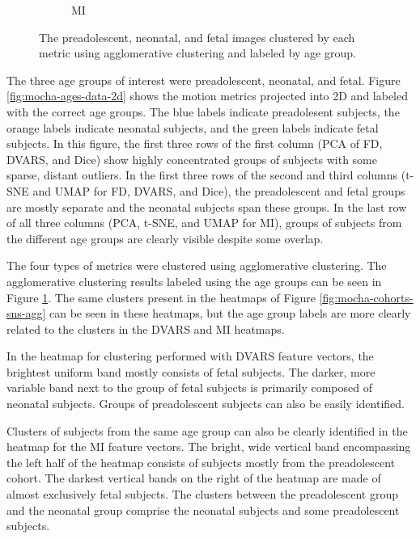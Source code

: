 \begin{figure}[]
\begin{subfigure}{0.49\textwidth}
		\caption{MI}
	\end{subfigure}
\vspace{-10mm}
\caption{The preadolescent, neonatal, and fetal images clustered by each metric using agglomerative clustering and labeled by age group.}
\label{fig:mocha-ages-sns-agg}
\end{figure}

The three age groups of interest were preadolescent, neonatal, and fetal. Figure \ref{fig:mocha-ages-data-2d} shows the motion metrics projected into 2D and labeled with the correct age groups. The blue labels indicate preadolesent subjects, the orange labels indicate neonatal subjects, and the green labels indicate fetal subjects. In this figure, the first three rows of the first column (PCA of FD, DVARS, and Dice) show highly concentrated groups of subjects with some sparse, distant outliers. In the first three rows of the second and third columns (t-SNE and UMAP for FD, DVARS, and Dice), the preadolescent and fetal groups are mostly separate and the neonatal subjects span these groups. In the last row of all three columns (PCA, t-SNE, and UMAP for MI), groups of subjects from the different age groups are clearly visible despite some overlap. 

The four types of metrics were clustered using agglomerative clustering. The agglomerative clustering results labeled using the age groups can be seen in Figure \ref{fig:mocha-ages-sns-agg}. The same clusters present in the heatmaps of Figure \ref{fig:mocha-cohorts-sns-agg} can be seen in these heatmaps, but the age group labels are more clearly related to the clusters in the DVARS and MI heatmaps.

In the heatmap for clustering performed with DVARS feature vectors, the brightest uniform band mostly consists of fetal subjects. The darker, more variable band next to the group of fetal subjects is primarily composed of neonatal subjects. Groups of preadolescent subjects can also be easily identified. 

Clusters of subjects from the same age group can also be clearly identified in the heatmap for the MI feature vectors. The bright, wide vertical band encompassing the left half of the heatmap consists of subjects mostly from the preadolescent cohort. The darkest vertical bands on the right of the heatmap are made of almost exclusively fetal subjects. The clusters between the preadolescent group and the neonatal group comprise the neonatal subjects and some preadolescent subjects. 

